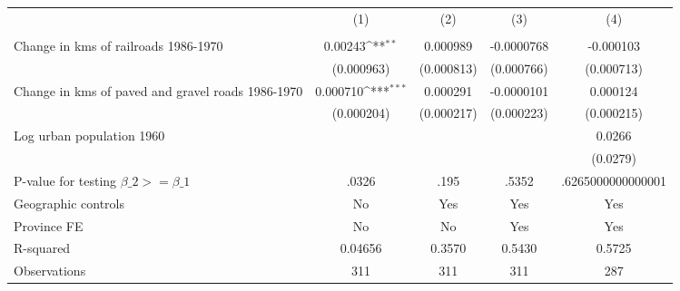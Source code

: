 {
\def\sym#1{\ifmmode^{#1}\else\(^{#1}\)\fi}
\begin{tabular}{l*{4}{c}}
\hline\hline
                &\multicolumn{1}{c}{(1)}&\multicolumn{1}{c}{(2)}&\multicolumn{1}{c}{(3)}&\multicolumn{1}{c}{(4)}\\
                &\multicolumn{1}{c}{}&\multicolumn{1}{c}{}&\multicolumn{1}{c}{}&\multicolumn{1}{c}{}\\
\hline
Change in kms of railroads 1986-1970&  0.00243\sym{**} & 0.000989         &-0.0000768         &-0.000103         \\
                &(0.000963)         &(0.000813)         &(0.000766)         &(0.000713)         \\
[1em]
Change in kms of paved and gravel roads 1986-1970& 0.000710\sym{***}& 0.000291         &-0.0000101         & 0.000124         \\
                &(0.000204)         &(0.000217)         &(0.000223)         &(0.000215)         \\
[1em]
Log urban population 1960&                  &                  &                  &   0.0266         \\
                &                  &                  &                  & (0.0279)         \\
\hline
P-value for testing $\beta\_{2} >= \beta\_{1}$&    .0326         &     .195         &    .5352         &.6265000000000001         \\
Geographic controls&       No         &      Yes         &      Yes         &      Yes         \\
Province FE     &       No         &       No         &      Yes         &      Yes         \\
R-squared       &  0.04656         &   0.3570         &   0.5430         &   0.5725         \\
Observations    &      311         &      311         &      311         &      287         \\
\hline\hline
\end{tabular}
}
